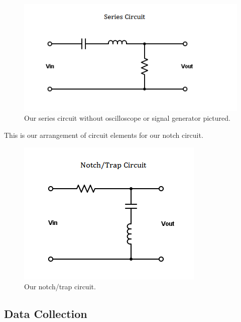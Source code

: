 \documentclass[11pt,letterpaper,onecolumn]{article}
\begin{document}
\begin{figure}[H]
    \centering
    \includegraphics{SeriesCir.png}
    \caption{Our series circuit without oscilloscope or signal generator pictured.}
    \label{fig:sercir}
\end{figure}

This is our arrangement of circuit elements for our notch circuit.

\begin{figure}[H]
    \centering
    \includegraphics{NotchCir.png}
    \caption{Our notch/trap circuit.}
    \label{fig:trapcir}
\end{figure}





\subsection{Data Collection}
\end{document}
